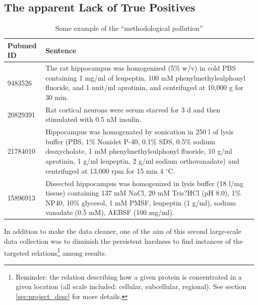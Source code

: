 \documentclass{report}
\begin{document}
		
		\subsection{The apparent Lack of True Positives}
		
		\begin{table}[t]
		\begin{tabularx}{\textwidth}{|l|X|}
		    \hline
		    \textbf{Pubmed ID} & \textbf{Sentence}\\
		    \hline
		    9483526 & The rat hippocampus was homogenized (5\% w/v) in cold PBS containing 1 mg/ml of leupeptin, 
		    100 mM phenylmethylsulphonyl fluoride, and 1 unit/ml aprotinin, and centrifuged at 10,000 g for 30 min.\\
		    \hline
		    20829391 & Rat cortical neurons were serum starved for 3 d and then stimulated with 0.5 nM insulin.\\
		    \hline
		    21784010 & Hippocampus was homogenated by sonication in 250 l of lysis buffer (PBS, 1\% Nonidet 
		    P-40, 0.1\% SDS, 0.5\% sodium deoxycholate, 1 mM phenylmethylsulphonyl fluoride, 10 g/ml aprotinin, 
		    1 g/ml leupeptin, 2 g/ml sodium orthovanadate) and centrifuged at 13,000 rpm for 15 min 4 $^\circ$C.\\
		    \hline
		    15896913 & Dissected hippocampus was homogenized in lysis buffer (18 l/mg tissue) containing 137 mM 
		    NaCl, 20 mM Tris?HCl (pH 8.0), 1\% NP40, 10\% glycerol, 1 mM PMSF, leupeptin (1 g/ml), sodium vanadate 
		    (0.5 mM), AEBSF (100 mg/ml).\\
		    \hline
		\end{tabularx}
		\caption{Some example of the ``methodological pollution''}
		\label{table:extrSent}
		\end{table}
		In addition to make the data cleaner, one of the aim of this second 
		large-scale data collection was to diminish the persistent hardness to
		find instances of the targeted relations\footnote{Reminder: the relation 
		describing how a given protein is concentrated in a given location (all 
		scale included: cellular, subcellular, regional). See section \ref{sec:project_desc} for more details.} among results. 
		
\end{document}
